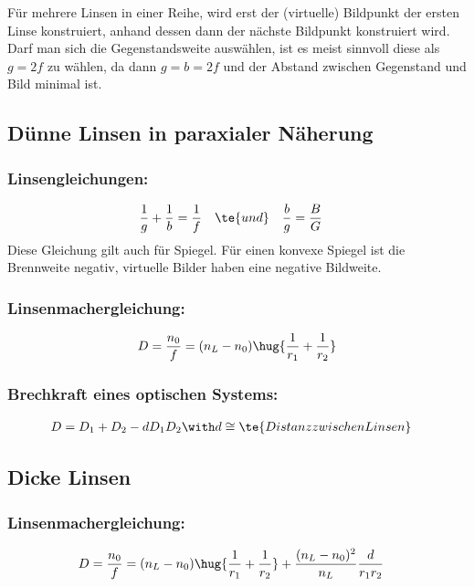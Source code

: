 \documentclass[twocolumn, unnumberedsubsub]{summery_5.0} %
\begin{document}
Für mehrere Linsen in einer Reihe, wird erst der (virtuelle) Bildpunkt der ersten Linse konstruiert,
anhand dessen dann der nächste Bildpunkt konstruiert wird.
Darf man sich die Gegenstandsweite auswählen, ist es meist sinnvoll diese als $g=2f$ zu wählen, da dann $g=b=2f$ und der Abstand zwischen Gegenstand und Bild minimal ist. 

\subsection{Dünne Linsen in paraxialer Näherung}

\subsubsection*{Linsengleichungen:}\tight
\begin{align*}
    \frac 1g + \frac 1b &= \frac 1f&&\te{und}&
    \frac{b}{g} &= \frac BG   
\end{align*}
Diese Gleichung gilt auch für Spiegel. Für einen konvexe Spiegel 
ist die Brennweite negativ, virtuelle Bilder haben eine negative Bildweite. \tight


\subsubsection*{Linsenmachergleichung:}\tight
\begin{align*}
    D = \frac {n_0}f = (n_L - n_0)\hug{\frac 1{r_1} + \frac 1{r_2}}
\end{align*}\ttight

\subsubsection*{Brechkraft eines optischen Systems:}\tight
\begin{align*}
    D &= D_1 + D_2 - d D_1 D_2\with d\cong \te{Distanz zwischen Linsen}
\end{align*}

\subsection{Dicke Linsen}
\subsubsection*{Linsenmachergleichung:}\tight
\begin{align*}
    D = \frac {n_0}f &= (n_L - n_0)\hug{\frac 1{r_1} + \frac 1{r_2}}
    + \frac{(n_L - n_0)^2}{n_L}\frac{d}{r_1r_2}
\end{align*}\ttight
\end{document}
